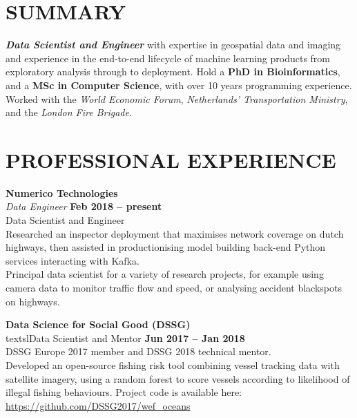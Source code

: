 \documentclass[margin,line]{resume}
\begin{document}
\begin{resume}

    \vspace{-3mm}

    \section{\mysidestyle \textbf{\large{S}\small{UMMARY}}}

    \textbf{\textsl{Data Scientist and Engineer}} with expertise in geospatial data and imaging and experience in the end-to-end lifecycle of machine learning products from exploratory analysis through to deployment. Hold a \textbf{PhD in Bioinformatics}, and a \textbf{MSc in Computer Science}, with over 10 years programming experience. Worked with the \textsl{World Economic Forum}, \textsl{Netherlands' Transportation Ministry}, and the \textsl{London Fire Brigade}.  
    \vspace{-1mm}

\sectionline

    \section{\mysidestyle \textbf{\large{P}\small{ROFESSIONAL} \large{E}\small{XPERIENCE}}}

    \textbf{\listing Numerico Technologies} \vspace{2mm}\\\vspace{1mm}%
    \textsl{Data Engineer} \hfill \textbf{Feb 2018 -- present}\\
    Data Scientist and Engineer \\
	 Researched an inspector deployment that maximises network coverage on dutch highways, then assisted in productionising model building back-end Python services interacting with Kafka. \\
     Principal data scientist for a variety of research projects, for example using camera data to monitor traffic flow and speed, or analysing accident blackspots on highways.

    \textbf{\listing Data Science for Social Good (DSSG)} \vspace{2mm}\\\vspace{1mm}%
    textsl{Data Scientist and Mentor} \hfill \textbf{Jun 2017 -- Jan 2018}\\
    DSSG Europe 2017 member and DSSG 2018 technical mentor. \\
     Developed an open-source fishing risk tool combining vessel tracking data with satellite imagery, using a random forest to score vessels according to likelihood of illegal fishing behaviours. Project code is available here: \url{https://github.com/DSSG2017/wef_oceans}


\end{resume}
\end{document}
